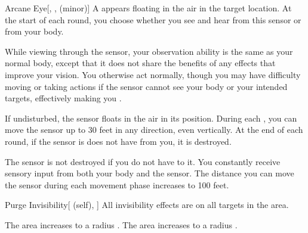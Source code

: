 \lowercase{\hypertarget{spell:Arcane Eye}{}}\label{spell:Arcane Eye}
\begin{freeability}[Rank 2]{\hypertarget{spell:Arcane Eye}{Arcane Eye}}[, ,  (minor)]
A  appears floating in the air in the target location.
At the start of each round, you choose whether you see and hear from this sensor or from your body.

While viewing through the sensor, your observation ability is the same as your normal body, except that it does not share the benefits of any  effects that improve your vision.
You otherwise act normally, though you may have difficulty moving or taking actions if the sensor cannot see your body or your intended targets, effectively making you \blinded.

If undisturbed, the sensor floats in the air in its position.
During each , you can move the sensor up to 30 feet in any direction, even vertically.
At the end of each round, if the sensor is does not have  from you, it is destroyed.

\rankline
{} The sensor is not destroyed if you do not have  to it.
 You constantly receive sensory input from both your body and the sensor.
 The distance you can move the sensor during each movement phase increases to 100 feet.
\end{freeability}
\vspace{0.25em}



\lowercase{\hypertarget{spell:Purge Invisibility}{}}\label{spell:Purge Invisibility}
\begin{attuneability}[Rank 2]{\hypertarget{spell:Purge Invisibility}{Purge Invisibility}}[ (self), ]
All invisibility effects are  on all targets in the area.

\rankline
{} The area increases to a \areahuge radius .
 The area increases to a \areaext radius .
\end{attuneability}
\vspace{0.25em}



